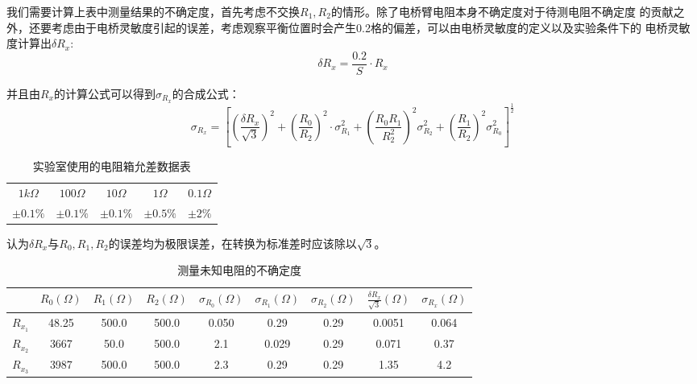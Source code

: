 \documentclass[a4paper]{ctexart}
\begin{document}
    \par 
    我们需要计算上表中测量结果的不确定度，首先考虑不交换$R_{1}, R_{2}$的情形。除了电桥臂电阻本身不确定度对于待测电阻不确定度
    的贡献之外，还要考虑由于电桥灵敏度引起的误差，考虑观察平衡位置时会产生0.2格的偏差，可以由电桥灵敏度的定义以及实验条件下的
    电桥灵敏度计算出$\delta R_{x}$:
    $$
    \delta R_{x}=\frac{0.2}{S} \cdot R_{x}
    $$
    \par 
    并且由$R_{x}$的计算公式可以得到$\sigma_{R_x}$的合成公式：
    $$
    \sigma_{R_{x}}=\left[\left(\frac{\delta R_{x}}{\sqrt{3}}\right)^{2}+\left(\frac{R_{0}}{R_{2}}\right)^{2} \cdot 
    \sigma_{R_{1}}^{2}+\left(\frac{R_{0} R_{1}}{R_{2}^{2}}\right)^{2} \sigma_{R_{2}}^{2}+\left(\frac{R_{1}}{R_{2}}\right)^{2} 
    \sigma_{R_{0}}^{2}\right]^{\frac{1}{2}}
    $$
    \begin{table}[htbp]
        \centering
        \caption{实验室使用的电阻箱允差数据表}
        \begin{tabular}{ccccc}
            \toprule[1.5pt]
            $1k\Omega$ & $100\Omega$ & $10\Omega$ & $1\Omega$ & $0.1\Omega$ \\
            $\pm 0.1\%$ & $\pm 0.1\%$ & $\pm 0.1\%$ & $\pm 0.5\%$ &$\pm 2\%$ \\
            \bottomrule[1.5pt]
        \end{tabular}
    \end{table}
    \par 
    认为$\delta R_{x}$与$R_{0},R_{1},R_{2}$的误差均为极限误差，在转换为标准差时应该除以$\sqrt{3}$。
    \begin{table}[htbp]
        \centering
        \caption{测量未知电阻的不确定度}
        \begin{tabular}{ccccccccc}
            \toprule[1.5pt]
                        & $R_{0}(\Omega)$ & $R_{1}(\Omega)$ & $R_{2}(\Omega)$ & $\sigma_{R_{0}}(\Omega)$ & $\sigma_{R_{1}}(\Omega)$ & $\sigma_{R_{2}}(\Omega)$ & $\frac{\delta R_{x}}{\sqrt{3}}(\Omega)$ & $\sigma_{R_{x}}(\Omega)$ \\
            \midrule
            $R_{x_{1}}$ & 48.25 & 500.0 & 500.0 & 0.050 & 0.29 & 0.29 & 0.0051 & 0.064 \\
            $R_{x_{2}}$ & 3667  & 50.0  & 500.0 & 2.1   & 0.029 & 0.29 &  0.071 & 0.37 \\
            $R_{x_{3}}$ & 3987  & 500.0 & 500.0 & 2.3   & 0.29 & 0.29 & 1.35 & 4.2\\
            \bottomrule[1.5pt]
        \end{tabular}
    \end{table}
\end{document}
